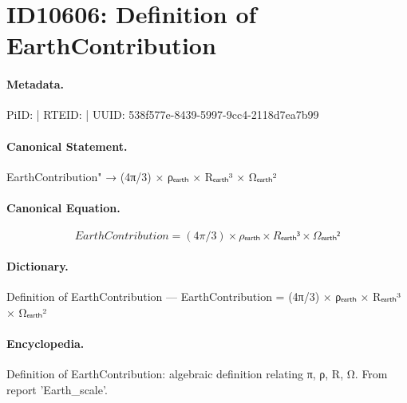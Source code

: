 \section*{ID10606: Definition of EarthContribution}
\paragraph{Metadata.}
PiID:  | RTEID:  | UUID: 538f577e-8439-5997-9cc4-2118d7ea7b99

\paragraph{Canonical Statement.}
EarthContribution" → (4π/3) × ρₑₐᵣₜₕ × Rₑₐᵣₜₕ³ × Ωₑₐᵣₜₕ²

\paragraph{Canonical Equation.}
\[
EarthContribution = (4π/3) × ρₑₐᵣₜₕ × Rₑₐᵣₜₕ³ × Ωₑₐᵣₜₕ²
\]

\paragraph{Dictionary.}
Definition of EarthContribution — EarthContribution = (4π/3) × ρₑₐᵣₜₕ × Rₑₐᵣₜₕ³ × Ωₑₐᵣₜₕ²

\paragraph{Encyclopedia.}
Definition of EarthContribution: algebraic definition relating π, ρ, R, Ω. From report 'Earth\_scale'.
